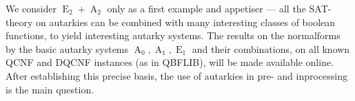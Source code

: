 \documentclass[conference]{IEEEtran}
\DeclareMathOperator{\Aaut}{A}
\DeclareMathOperator{\Eaut}{E}
\begin{document}
We consider $\Eaut_2 + \Aaut_2$ only as a first example and appetiser --- all the SAT-theory on autarkies can be combined with many interesting classes of boolean functions, to yield interesting autarky systems.
The results on the normalforms by the basic autarky systems $\Aaut_0, \Aaut_1, \Eaut_1$ and their combinations, on all known QCNF and DQCNF instances (as in QBFLIB), will be made available online.
After establishing this precise basis, the use of autarkies in pre- and inprocessing is the main question.


%
%


\end{document}
